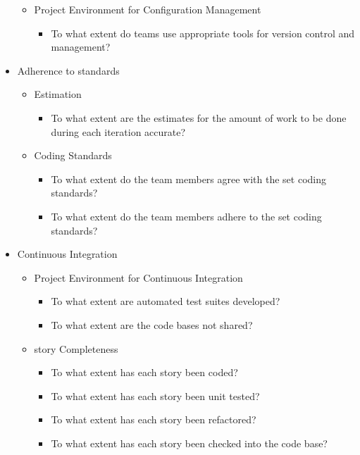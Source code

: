 \begin{appendices}
\begin{itemize}
		\begin{itemize}
			\item Project Environment for Configuration Management
				\begin{itemize}
					\item To what extent do teams use appropriate tools for version control and management?
				\end{itemize}
		\end{itemize}
	\item Adherence to standards
		\begin{itemize}
			\item Estimation
				\begin{itemize}
					\item To what extent are the estimates for the amount of work to be done during each iteration accurate?
				\end{itemize}
			\item Coding Standards
				\begin{itemize}
					\item To what extent do the team members agree with the set coding standards? 
					\item To what extent do the team members adhere to the set coding standards?
				\end{itemize}
		\end{itemize}
	\item Continuous Integration
		\begin{itemize}
			\item Project Environment for Continuous Integration 
				\begin{itemize}
					\item To what extent are automated test suites developed?
					\item To what extent are the code bases not shared?
				\end{itemize}
			\item story Completeness
				\begin{itemize}
					\item To what extent has each story been coded? 
					\item To what extent has each story been unit tested? 
					\item To what extent has each story been refactored? 
					\item To what extent has each story been checked into the code base? 

\end{itemize}
\end{itemize}
\end{itemize}
\end{appendices}
